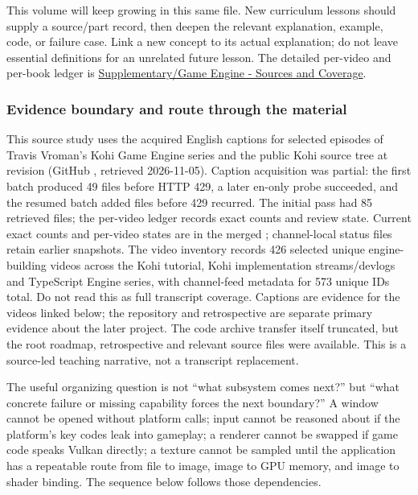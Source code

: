 This volume will keep growing in this same file. New curriculum lessons should supply a source/part record, then deepen the relevant explanation, example, code, or failure case. Link a new concept to its actual explanation; do not leave essential definitions for an unrelated future lesson. The detailed per-video and per-book ledger is \hyperref[appendix-877738f6f4d2]{Supplementary/Game Engine - Sources and Coverage}.

\subsubsection{Evidence boundary and route through the material}\label{06-engine-ii-ch042-evidence-boundary-and-route-through-the-material}

\hypertarget{06-engine-ii-ch042-evidence-boundary-and-route-through-the-material}{}

This source study uses the acquired English captions for selected episodes of Travis Vroman's Kohi Game Engine series and the public Kohi source tree at revision  (GitHub , retrieved 2026-11-05). Caption acquisition was partial: the first batch produced 49 files before HTTP 429, a later en-only probe succeeded, and the resumed batch added files before 429 recurred. The initial pass had 85 retrieved files; the per-video ledger records exact counts and review state. Current exact counts and per-video states are in the merged ; channel-local status files retain earlier snapshots. The video inventory records 426 selected unique engine-building videos across the Kohi tutorial, Kohi implementation streams/devlogs and TypeScript Engine series, with channel-feed metadata for 573 unique IDs total. Do not read this as full transcript coverage. Captions are evidence for the videos linked below; the repository and retrospective are separate primary evidence about the later project. The code archive transfer itself truncated, but the root roadmap, retrospective and relevant source files were available. This is a source-led teaching narrative, not a transcript replacement.

The useful organizing question is not ``what subsystem comes next?'' but ``what concrete failure or missing capability forces the next boundary?'' A window cannot be opened without platform calls; input cannot be reasoned about if the platform's key codes leak into gameplay; a renderer cannot be swapped if game code speaks Vulkan directly; a texture cannot be sampled until the application has a repeatable route from file to image, image to GPU memory, and image to shader binding. The sequence below follows those dependencies.

